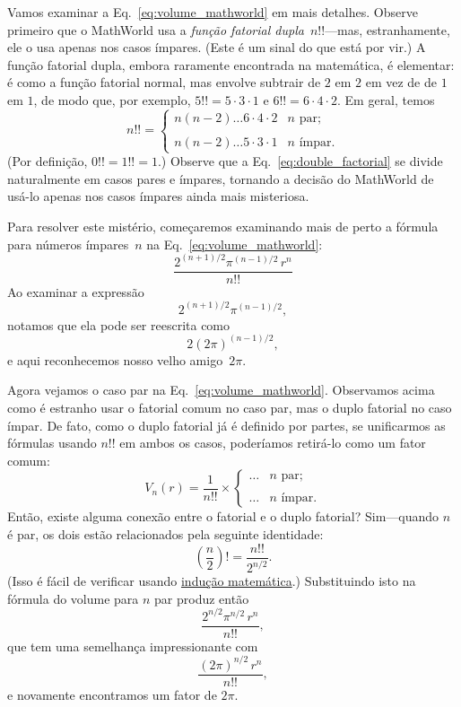 Vamos examinar a Eq.~\eqref{eq:volume_mathworld} em mais detalhes. Observe primeiro que o MathWorld usa a \emph{função fatorial dupla}~$n!!$---mas, estranhamente, ele o usa apenas nos casos ímpares. (Este é um sinal do que está por vir.) A função fatorial dupla, embora raramente encontrada na matemática, é elementar: é como a função fatorial normal, mas envolve subtrair de $2$ em $2$ em vez de de $1$ em $1$, de modo que, por exemplo, $5!! = 5 \cdot 3 \cdot 1$ e $6!! = 6 \cdot 4 \cdot 2$. Em geral, temos
\begin{equation}
\label{eq:double_factorial}
n!! = \begin{cases}
n(n-2)\ldots6\cdot4\cdot2 & n \text{ par}; \\ \\
n(n-2)\ldots5\cdot3\cdot1 & n \text{ ímpar}.
\end{cases}
\end{equation}
(Por definição, $0!! = 1!! = 1$.) Observe que a Eq.~\eqref{eq:double_factorial} se divide naturalmente em casos pares e ímpares, tornando a decisão do MathWorld de usá-lo apenas nos casos ímpares ainda mais misteriosa.

Para resolver este mistério, começaremos examinando mais de perto a fórmula para números ímpares~$n$ na Eq.~\eqref{eq:volume_mathworld}:
\[ \frac{2^{(n+1)/2}\pi^{(n-1)/2}\,r^n}{n!!} \]
Ao examinar a expressão
\[ 2^{(n+1)/2}\pi^{(n-1)/2}, \]
notamos que ela pode ser reescrita como
\[ 2(2\pi)^{(n-1)/2}, \]
e aqui reconhecemos nosso velho amigo~$2\pi$.

Agora vejamos o caso par na Eq.~\eqref{eq:volume_mathworld}. Observamos acima como é estranho usar o fatorial comum no caso par, mas o duplo fatorial no caso ímpar. De fato, como o duplo fatorial já é definido por partes, se unificarmos as fórmulas usando $n!!$ em ambos os casos, poderíamos retirá-lo como um fator comum:
\[
V_n(r) = \frac{1}{n!!}\times \begin{cases}
\ldots & n \text{ par}; \\ \\
 \ldots & n \text{ ímpar}.
 \end{cases}
\]
Então, existe alguma conexão entre o fatorial e o duplo fatorial? Sim---quando $n$ é par, os dois estão relacionados pela seguinte identidade:
\[ \left(\frac{n}{2}\right)! = \frac{n!!}{2^{n/2}}. \]
(Isso é fácil de verificar usando \href{https://pt.wikipedia.org/wiki/Indu%C3%A7%C3%A3o_matem%C3%A1tica}{indução matemática}.) Substituindo isto na fórmula do volume para $n$ par produz então
\[ \frac{2^{n/2}\pi^{n/2}\,r^n}{n!!}, \]
que tem uma semelhança impressionante com
\[ \frac{(2\pi)^{n/2}\,r^n}{n!!}, \]
e novamente encontramos um fator de $2\pi$.

